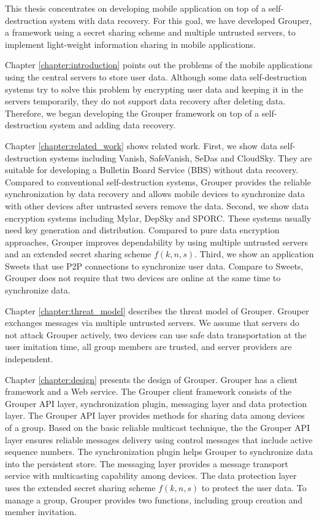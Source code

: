 \documentclass[a4paper,11pt]{report}
\begin{document}
This thesis concentrates on developing mobile application on top of a self-destruction system with data recovery.
For this goal, we have developed Grouper, a framework using a secret sharing scheme and multiple untrusted servers, to implement light-weight information sharing in mobile applications.

Chapter \ref{chapter:introduction} points out the problems of the mobile applications using the central servers to store user data.
Although some data self-destruction systems try to solve this problem by encrypting user data and keeping it in the servers temporarily, they do not support data recovery after deleting data.
Therefore, we began developing the Grouper framework on top of a self-destruction system and adding data recovery.

Chapter \ref{chapter:related_work} shows related work.
First, we show data self-destruction systems including Vanish, SafeVanish, SeDas and CloudSky.
They are suitable for developing a Bulletin Board Service (BBS) without data recovery.
Compared to conventional self-destruction systems, Grouper provides the reliable synchronization by data recovery and allows mobile devices to synchronize data with other devices after untrusted severs remove the data.
Second, we show data encryption systems including Mylar, DepSky and SPORC.
These systems usually need key generation and distribution.
Compared to pure data encryption approaches, Grouper improves dependability by using multiple untrusted servers and an extended secret sharing scheme $f(k, n, s)$.
Third, we show an application Sweets that use P2P connections to synchronize user data.
Compare to Sweets, Grouper does not require that two devices are online at the same time to synchronize data.

Chapter \ref{chapter:threat_model} describes the threat model of Grouper.
Grouper exchanges messages via multiple untrusted servers.
We assume that servers do not attack Grouper actively, two devices can use safe data transportation at the user imitation time, all group members are trusted, and server providers are independent.  

Chapter \ref{chapter:design} presents the design of Grouper.
Grouper has a client framework and a Web service.
The Grouper client framework consists of the Grouper API layer, synchronization plugin, messaging layer and data protection layer.
The Grouper API layer provides methods for sharing data among devices of a group.
Based on the basic reliable multicast technique, the the Grouper API layer ensures reliable messages delivery using control messages that include active sequence numbers.
The synchronization plugin helps Grouper to synchronize data into the persistent store.
The messaging layer provides a message transport service with multicasting capability among devices.
The data protection layer uses the extended secret sharing scheme $f(k ,n, s)$ to protect the user data.
To manage a group, Grouper provides two functions, including group creation and member invitation.
\end{document}
